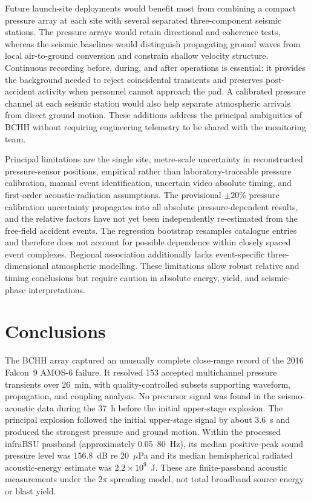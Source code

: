 \documentclass[]{seismica}
\begin{document}
Future launch-site deployments would benefit most from combining a compact
pressure array at each site with several separated three-component seismic
stations. The pressure arrays would retain directional and coherence tests,
whereas the seismic baselines would distinguish propagating ground waves from
local air-to-ground conversion and constrain shallow velocity structure.
Continuous recording before, during, and after operations is essential: it
provides the background needed to reject coincidental transients and preserves
post-accident activity when personnel cannot approach the pad. A calibrated
pressure channel at each seismic station would also help separate atmospheric
arrivals from direct ground motion. These additions address the principal
ambiguities of BCHH without requiring engineering telemetry to be shared with
the monitoring team.

Principal limitations are the single site, metre-scale uncertainty in
reconstructed pressure-sensor positions, empirical rather than
laboratory-traceable pressure calibration, manual event identification, uncertain video
absolute timing, and first-order acoustic-radiation assumptions. The provisional
$\pm20\%$ pressure calibration uncertainty propagates into all absolute
pressure-dependent results, and the relative factors have not yet been
independently re-estimated from the free-field accident events. The regression
bootstrap resamples catalogue entries and therefore does not account for
possible dependence within closely spaced event complexes. Regional
association additionally lacks event-specific three-dimensional atmospheric
modelling. These limitations allow robust relative and timing conclusions but
require caution in absolute energy, yield, and seismic-phase interpretations.

\section{Conclusions}
\label{sec:conclusions}

The BCHH array captured an unusually complete close-range record of the 2016
Falcon~9 AMOS-6 failure. It resolved 153 accepted multichannel pressure
transients over 26~min, with quality-controlled subsets supporting waveform,
propagation, and coupling analysis. No precursor signal was found in the
seismo-acoustic data during the 37~h before the initial upper-stage explosion. The principal explosion followed
the initial upper-stage signal by about 3.6~s and produced the strongest pressure
and ground motion. Within the processed infraBSU passband (approximately
0.05--80~Hz), its median positive-peak sound pressure level was 156.8~dB re
20~$\mu$Pa and its median hemispherical radiated acoustic-energy estimate was
$2.2\times10^9$~J. These are
finite-passband acoustic measurements under the $2\pi$ spreading model, not
total broadband source energy or blast yield.
\end{document}
